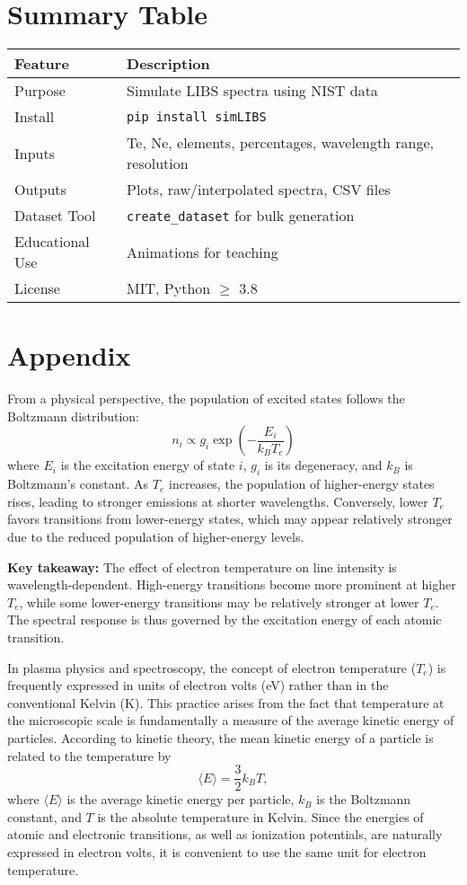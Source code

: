 \documentclass[12pt,a4paper]{article}
\begin{document}
	\section{Summary Table}
	\begin{center}
		\begin{tabular}{@{}ll@{}}
			\toprule
			\textbf{Feature} & \textbf{Description} \\
			\midrule
			Purpose & Simulate LIBS spectra using NIST data \\
			Install & \verb|pip install simLIBS| \\
			Inputs & Te, Ne, elements, percentages, wavelength range, resolution \\
			Outputs & Plots, raw/interpolated spectra, CSV files \\
			Dataset Tool & \verb|create_dataset| for bulk generation \\
			Educational Use & Animations for teaching \\
			License & MIT, Python $\geq$ 3.8 \\
			\bottomrule
		\end{tabular}
	\end{center}
	\section{Appendix}
	From a physical perspective, the population of excited states follows the Boltzmann distribution:
	\[
	n_i \propto g_i \exp\left(-\frac{E_i}{k_B T_e}\right)
	\]
	where $E_i$ is the excitation energy of state $i$, $g_i$ is its degeneracy, and $k_B$ is Boltzmann’s constant. As $T_e$ increases, the population of higher-energy states rises, leading to stronger emissions at shorter wavelengths. Conversely, lower $T_e$ favors transitions from lower-energy states, which may appear relatively stronger due to the reduced population of higher-energy levels.
	
	\textbf{Key takeaway:} The effect of electron temperature on line intensity is wavelength-dependent. High-energy transitions become more prominent at higher $T_e$, while some lower-energy transitions may be relatively stronger at lower $T_e$. The spectral response is thus governed by the excitation energy of each atomic transition.
	
	
	In plasma physics and spectroscopy, the concept of electron temperature ($T_e$) is frequently expressed in units of electron volts (eV) rather than in the conventional Kelvin (K). This practice arises from the fact that temperature at the microscopic scale is fundamentally a measure of the average kinetic energy of particles. According to kinetic theory, the mean kinetic energy of a particle is related to the temperature by  
	\[
	\langle E \rangle = \frac{3}{2} k_B T,
	\]  
	where $\langle E \rangle$ is the average kinetic energy per particle, $k_B$ is the Boltzmann constant, and $T$ is the absolute temperature in Kelvin. Since the energies of atomic and electronic transitions, as well as ionization potentials, are naturally expressed in electron volts, it is convenient to use the same unit for electron temperature.  
	
\end{document}
